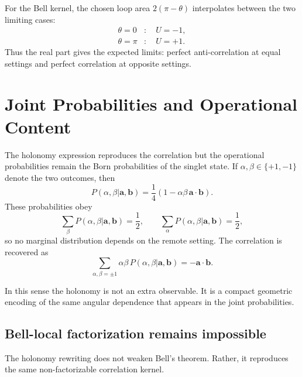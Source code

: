 \documentclass[
  aps,
  pra,
  reprint,
  superscriptaddress,
  nofootinbib,
  longbibliography,
  floatfix,
  amsmath,
  amssymb
]{revtex4-2}
\theoremstyle{plain}
\theoremstyle{definition}
\theoremstyle{remark}
\begin{document}
For the Bell kernel, the chosen loop area \(2(\pi-\theta)\) interpolates between the two limiting cases:
\begin{align}
\theta=0 &: \quad U=-1,\\
\theta=\pi &: \quad U=+1.
\end{align}
Thus the real part gives the expected limits: perfect anti-correlation at equal settings and perfect correlation at opposite settings.

\section{Joint Probabilities and Operational Content}
\label{sec:probabilities}

The holonomy expression reproduces the correlation but the operational probabilities remain the Born probabilities of the singlet state.  If \(\alpha,\beta\in\{+1,-1\}\) denote the two outcomes, then
\begin{equation}
P(\alpha,\beta|\bm a,\bm b)
=\frac14\left(1-\alpha\beta\,\bm a\cdot\bm b\right).
\label{eq:jointprob}
\end{equation}
These probabilities obey
\begin{equation}
\sum_{\beta}P(\alpha,\beta|\bm a,\bm b)=\frac12,
\qquad
\sum_{\alpha}P(\alpha,\beta|\bm a,\bm b)=\frac12,
\end{equation}
so no marginal distribution depends on the remote setting.  The correlation is recovered as
\begin{equation}
\sum_{\alpha,\beta=\pm1}\alpha\beta\,
P(\alpha,\beta|\bm a,\bm b)=-\bm a\cdot\bm b.
\end{equation}

In this sense the holonomy is not an extra observable.  It is a compact geometric encoding of the same angular dependence that appears in the joint probabilities.


\subsection{Bell-local factorization remains impossible}
\label{subsec:nolocalfactorization}

The holonomy rewriting does not weaken Bell's theorem.  Rather, it reproduces the same non-factorizable correlation kernel.
\end{document}
